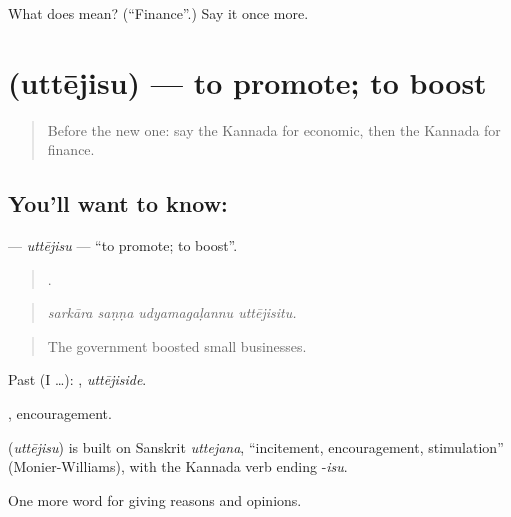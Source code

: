\begin{tcolorbox}[breakable,colback=teal!4,colframe=teal!35!black,title={Before you move on}]
What does  mean? (\textquotedblleft{}Finance\textquotedblright{}.) Say it once more.
\end{tcolorbox}
\section[\texorpdfstring{\kn{ಉತ್ತೇಜಿಸು} (uttējisu)}{ಉತ್ತೇಜಿಸು (uttējisu)}]{ (uttējisu) — to promote; to boost}

\label{lesson:KA-C401-uttejisu}



\begin{quote}
Before the new one: say the Kannada for economic, then the Kannada for finance.
\end{quote}

\subsection*{You'll want to know: }
\textbf{} — \emph{uttējisu} — \textquotedblleft{}to promote; to boost\textquotedblright{}.

\begin{quote}
   .
\end{quote}

\begin{quote}
\emph{sarkāra saṇṇa udyamagaḷannu uttējisitu.}
\end{quote}

\begin{quote}
The government boosted small businesses.
\end{quote}

Past (I …): , \emph{uttējiside}.

, encouragement.

\begin{cousinweb}
\textbf{} (\emph{uttējisu}) is built on Sanskrit \emph{uttejana}, \textquotedblleft{}incitement, encouragement, stimulation\textquotedblright{} (Monier-Williams), with the Kannada verb ending -\emph{isu}.
\end{cousinweb}

\begin{grammarlens}[title={What you've built}]
One more word for giving reasons and opinions.
\end{grammarlens}

